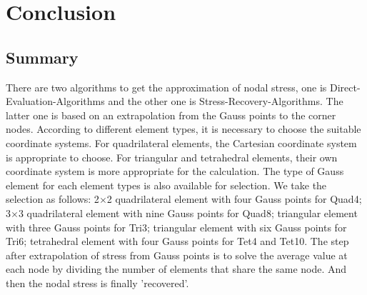 \chapter{Conclusion}
\section{Summary}
There are two algorithms to get the approximation of nodal stress, one is Direct-Evaluation-Algorithms and the other one is Stress-Recovery-Algorithms. The latter one is based on an extrapolation from the Gauss points to the corner nodes. According to different element types, it is necessary to choose the suitable coordinate systems. For quadrilateral elements, the Cartesian coordinate system is appropriate to choose. For triangular and tetrahedral elements, their own coordinate system is more appropriate for the calculation. The type of Gauss element for each element types is also available for selection. We take the selection as follows: 2$\times$2 quadrilateral element with four Gauss points for Quad4; 3$\times$3 quadrilateral element with nine Gauss points for Quad8; triangular element with three Gauss points for Tri3; triangular element with six Gauss points for Tri6; tetrahedral element with four Gauss points for Tet4 and Tet10. The step after extrapolation of stress from Gauss points is to solve the average value at each node by dividing the number of elements that share the same node. And then the nodal stress is finally 'recovered'. 

